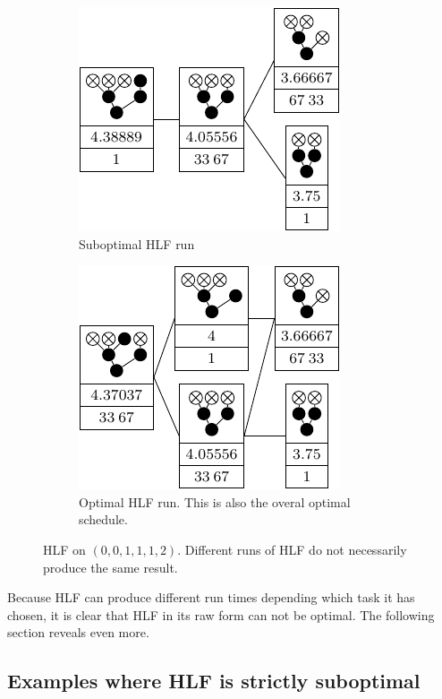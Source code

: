 \begin{figure}[ht]
  \centering
  \begin{subfigure}{.45\linewidth}
    \centering
    \includegraphics{p3/hlf_not_optimal/001112_hlf_subopt.pdf}
    \caption{Suboptimal HLF run}
  \end{subfigure}
  \begin{subfigure}{.45\linewidth}
    \centering
    \includegraphics{p3/hlf_not_optimal/001112_hlf_opt.pdf}
    \caption{Optimal HLF run. This is also the overal optimal schedule.}
    \label{fig:hlf-001112-optimal-version}
  \end{subfigure}
  \caption{HLF on $(0,0,1,1,1,2)$. Different runs of HLF do not necessarily produce the same result.}
  \label{fig:hlf-001112}
\end{figure}

Because HLF can produce different run times depending which task it has chosen, it is clear that HLF in its raw form can not be optimal. The following section reveals even more.

\subsection{Examples where HLF is strictly suboptimal}
\label{sec:p3-suboptimal-hlf-strictly-suboptimal}

